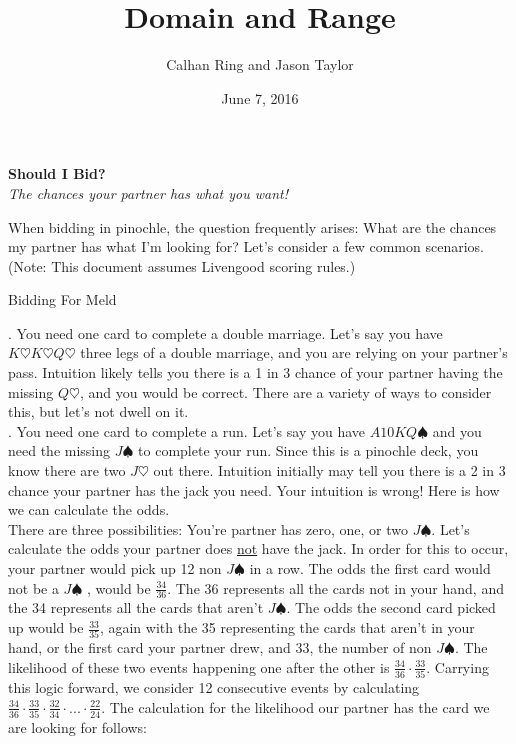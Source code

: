 \documentclass[11pt]{article}
\title{Domain and Range}
\author{Calhan Ring and Jason Taylor}
\date{June 7, 2016}
\begin{document}
\begin{center}
  \textbf{Should I Bid?}\\
  \textit{The chances your partner has what you want!}
\end{center}

When bidding in pinochle, the question frequently arises: What are the chances my partner has what I'm looking for? Let's consider a few common scenarios. (Note: This document assumes Livengood scoring rules.)

\begin{center}
  Bidding For Meld\\
\end{center}

. You need one card to complete a double marriage. Let's say you have $ K\heartsuit K \heartsuit Q \heartsuit $ three legs of a double marriage, and you are relying on your partner's pass. Intuition likely tells you there is a 1 in 3 chance of your partner having the missing $ Q\heartsuit$, and you would be correct. There are a variety of ways to consider this, but let's not dwell on it. \\
. You need one card to complete a run. Let's say you have $A10KQ\spadesuit $ and you need the missing $J\spadesuit$ to complete your run. Since this is a pinochle deck, you know there are two $J\heartsuit$ out there. Intuition initially may tell you there is a 2 in 3 chance your partner has the jack you need. Your intuition is wrong! Here is how we can calculate the odds.\\
\indent There are three possibilities: You're partner has zero, one, or two  $ J \spadesuit$. Let's calculate the odds your partner does \underline{not} have the jack. In order for this to occur, your partner would pick up 12 non $ J\spadesuit$ in a row. The odds the first card would not be a $ J\spadesuit$ , would be $ \frac{34}{36} $. The 36 represents all the cards not in your hand, and the 34 represents all the cards that aren't $J\spadesuit$. The odds the second card picked up would be $\frac{33}{35}$, again with the 35 representing the cards that aren't in your hand, or the first card your partner drew, and 33, the number of non $J\spadesuit$. The likelihood of these two events happening one after the other is $\frac{34}{36}\cdot \frac{33}{35}$. Carrying this logic forward, we consider 12 consecutive events by calculating $\frac{34}{36}\cdot \frac{33}{35}\cdot \frac{32}{34}\cdot ... \cdot\frac{22}{24}$. The calculation for the likelihood our partner has the card we are looking for follows:
\end{document}
